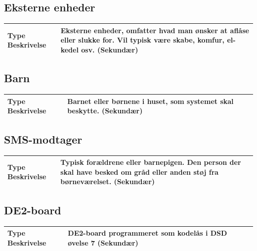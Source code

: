 \begin{table}[!htbp] \centering
\subsection{Eksterne enheder}
\begin{tabular}{|p{4cm}|p{8cm}|}
	\hline
		\textbf{Type Beskrivelse} &
			Eksterne enheder, omfatter hvad man ønsker at aflåse eller slukke for. 
			Vil typisk være skabe, komfur, el-kedel osv. (Sekundær) \\\hline
	\end{tabular}
\end{table}

\begin{table}[!htbp] \centering
\subsection{Barn}
\begin{tabular}{|p{4cm}|p{8cm}|}
	\hline
		\textbf{Type Beskrivelse} &
			Barnet eller børnene i huset, som systemet skal beskytte.	(Sekundær) \\\hline
	\end{tabular}
\end{table}

\begin{table}[!htbp] \centering
\subsection{SMS-modtager}
\begin{tabular}{|p{4cm}|p{8cm}|}
	\hline
		\textbf{Type Beskrivelse} &
			Typisk forældrene eller barnepigen. Den person der skal have besked om gråd eller anden støj fra børneværelset. (Sekundær) \\\hline
	\end{tabular}
\end{table}

\begin{table}[!htbp] \centering
\subsection{DE2-board}
\begin{tabular}{|p{4cm}|p{8cm}|}
	\hline
		\textbf{Type Beskrivelse} &
			DE2-board programmeret som kodelås i DSD øvelse 7 (Sekundær) \\\hline
	\end{tabular}
\end{table}

